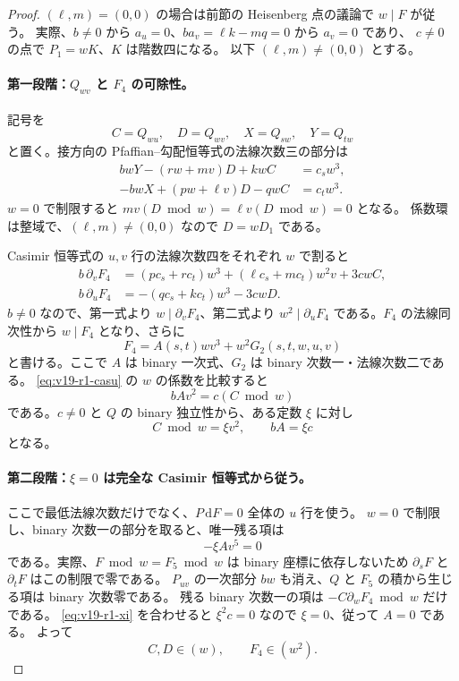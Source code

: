 \documentclass[11pt,a4paper]{ltjsarticle}
\theoremstyle{remark}\newtheorem{remark}[theorem]{注意}
\begin{document}
\begin{proof}
$(\ell,m)=(0,0)$ の場合は前節の Heisenberg 点の議論で $w\mid F$ が従う。
実際、$b\ne0$ から $a_u=0$、$ba_v=\ell k-mq=0$ から $a_v=0$ であり、
$c\ne0$ の点で $P_1=wK$、$K$ は階数四になる。
以下 $(\ell,m)\ne(0,0)$ とする。

\paragraph{第一段階：$Q_{wv}$ と $F_4$ の可除性。}
記号を
\[
 C=Q_{wu},\quad D=Q_{wv},\quad X=Q_{sw},\quad Y=Q_{tw}
\]
と置く。接方向の Pfaffian--勾配恒等式の法線次数三の部分は
\begin{align}
 bwY-(rw+mv)D+kwC&=c_s w^3,\label{eq:v19-r1-pfs}\\
 -bwX+(pw+\ell v)D-qwC&=c_t w^3.\label{eq:v19-r1-pft}
\end{align}
$w=0$ で制限すると $mv(D\bmod w)=\ell v(D\bmod w)=0$ となる。
係数環は整域で、$(\ell,m)\ne(0,0)$ なので $D=wD_1$ である。

Casimir 恒等式の $u,v$ 行の法線次数四をそれぞれ $w$ で割ると
\begin{align}
 b\,\partial_vF_4
  &=(pc_s+rc_t)w^3+(\ell c_s+mc_t)w^2v+3cwC,
  \label{eq:v19-r1-casu}\\
 b\,\partial_uF_4
  &=-(qc_s+kc_t)w^3-3cwD.
  \label{eq:v19-r1-casv}
\end{align}
$b\ne0$ なので、第一式より $w\mid\partial_vF_4$、第二式より
$w^2\mid\partial_uF_4$ である。$F_4$ の法線同次性から $w\mid F_4$ となり、さらに
\[
 F_4=A(s,t)wv^3+w^2G_2(s,t,w,u,v)
\]
と書ける。ここで $A$ は binary 一次式、$G_2$ は binary 次数一・法線次数二である。
\eqref{eq:v19-r1-casu} の $w$ の係数を比較すると
\[
                    bA v^2=c(C\bmod w)
\]
である。$c\ne0$ と $Q$ の binary 独立性から、ある定数 $\xi$ に対し
\begin{equation}\label{eq:v19-r1-xi}
                    C\bmod w=\xi v^2,\qquad bA=\xi c
\end{equation}
となる。

\paragraph{第二段階：$\xi=0$ は完全な Casimir 恒等式から従う。}
ここで最低法線次数だけでなく、$P\,\mathrm dF=0$ 全体の $u$ 行を使う。
$w=0$ で制限し、binary 次数一の部分を取ると、唯一残る項は
\[
                        -\xi A v^5=0
\]
である。実際、$F\bmod w=F_5\bmod w$ は binary 座標に依存しないため
$\partial_sF$ と $\partial_tF$ はこの制限で零である。
$P_{uv}$ の一次部分 $bw$ も消え、$Q$ と $F_5$ の積から生じる項は binary 次数零である。
残る binary 次数一の項は $-C\partial_wF_4\bmod w$ だけである。
\eqref{eq:v19-r1-xi} を合わせると $\xi^2c=0$ なので $\xi=0$、従って $A=0$ である。
よって
\begin{equation}\label{eq:v19-r1-divisibility}
                    C,D\in(w),\qquad F_4\in(w^2).
\end{equation}


\end{proof}
\end{document}
